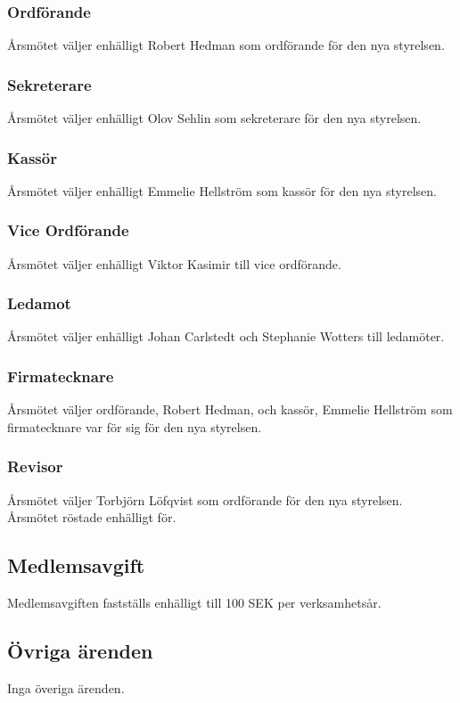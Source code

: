 \documentclass{article}
\begin{document}
\subsubsection{Ordförande}
Årsmötet väljer enhälligt Robert Hedman som ordförande för den nya styrelsen. 

\subsubsection{Sekreterare}
Årsmötet väljer enhälligt Olov Sehlin som sekreterare för den nya styrelsen.

\subsubsection{Kassör}
Årsmötet väljer enhälligt Emmelie Hellström som kassör för den nya styrelsen.

\subsubsection{Vice Ordförande}
Årsmötet väljer enhälligt Viktor Kasimir till vice ordförande.

\subsubsection{Ledamot}
Årsmötet väljer enhälligt Johan Carlstedt och Stephanie Wotters till ledamöter.


\subsubsection{Firmatecknare}
Årsmötet väljer ordförande, Robert Hedman, och kassör, Emmelie Hellström som firmatecknare var för sig för den nya styrelsen. 

\subsubsection{Revisor}
Årsmötet väljer Torbjörn Löfqvist som ordförande för den nya styrelsen. Årsmötet röstade enhälligt för.

\subsection{Medlemsavgift}
Medlemsavgiften fastställs enhälligt till 100 SEK per verksamhetsår.
\subsection{Övriga ärenden}
Inga överiga ärenden.
\end{document}
